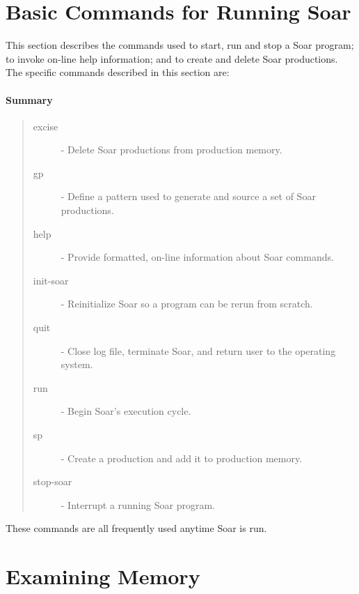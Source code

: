 \section{Basic Commands for Running Soar}
\label{BASIC}

This section describes the commands used to start, run and stop a Soar 
program; to invoke on-line help information; and to create and 
delete Soar productions.  The specific commands described in this
section are:

\paragraph{Summary}
\begin{quote}
\begin{description}
\item[excise] - Delete Soar productions from production memory.
\item[gp] - Define a pattern used to generate and source a set of Soar productions.
\item[help] - Provide formatted, on-line information about Soar commands.
\item[init-soar] - Reinitialize Soar so a program can be rerun from scratch.
\item[quit] - Close log file, terminate Soar, and return user to the operating system.
\item[run] - Begin Soar's execution cycle.
\item[sp] - Create a production and add it to production memory.
\item[stop-soar] - Interrupt a running Soar program.
\end{description}
\end{quote}
These commands are all frequently used anytime Soar is run.










\section{Examining Memory}
\label{MEMORY}

